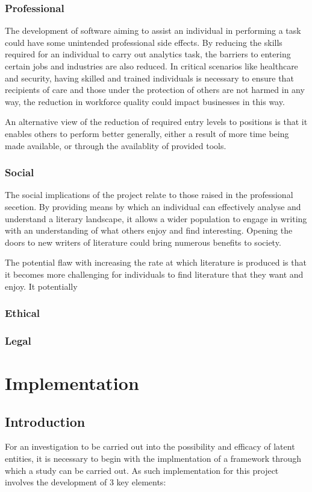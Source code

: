 \documentclass[10pt]{report}
\begin{document}
\subsection{Professional}
The development of software aiming to assist an individual in performing a task could have some unintended professional side effects. By reducing the skills required for an individual to carry out analytics task, the barriers to entering certain jobs and industries are also reduced. In critical scenarios like healthcare and security, having skilled and trained individuals is necessary to ensure that recipients of care and those under the protection of others are not harmed in any way, the reduction in workforce quality could impact businesses in this way.

An alternative view of the reduction of required entry levels to positions is that it enables others to perform better generally, either a result of more time being made available, or through the availablity of provided tools.

\subsection{Social}
The social implications of the project relate to those raised in the professional secetion. By providing means by which an individual can effectively analyse and understand a literary landscape, it allows a wider population to engage in writing with an understanding of what others enjoy and find interesting. Opening the doors to new writers of literature could bring numerous benefits to society.

The potential flaw with increasing the rate at which literature is produced is that it becomes more challenging for individuals to find literature that they want and enjoy. It potentially 

\subsection{Ethical}


\subsection{Legal}


%
%
%
%
%
\chapter{Implementation}
\section{Introduction}
For an investigation to be carried out into the possibility and efficacy of latent entities, it is necessary to begin with the implmentation of a framework through which a study can be carried out. As such implementation for this project involves the development of 3 key elements:
\end{document}
